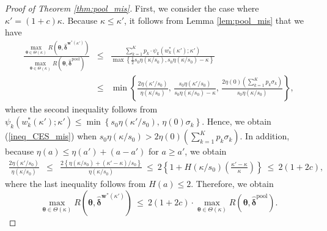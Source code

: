 \documentclass[12pt,a4paper]{article}
\begin{document}
\begin{proof}[Proof of Theorem \ref{thm:pool_mis}]
First, we consider the case where $\kappa' =(1+c)\kappa$. Because $\kappa \leq \kappa'$, it follows from Lemma \ref{lem:pool_mis} that we have
\begin{eqnarray}
\frac{\max_{\bm{\theta} \in \Theta(\kappa)} R(\bm{\theta},\hat{\bm{\delta}}^{\bm{w}^{\ast}(\kappa')})}{\max_{\bm{\theta} \in \Theta(\kappa)} R(\bm{\theta},\hat{\bm{\delta}}^{\mathrm{pool}})} & \leq & \frac{\sum_{k=1}^K p_k \cdot \psi_k\left( w_k^{\ast}(\kappa') ;\kappa' \right)}{\max \left\{ \frac{1}{2} s_0 \eta ( \kappa / s_0 ), s_0 \eta ( \kappa / s_0 ) - \kappa \right\}} \nonumber \\
& \leq & \min \left\{ \frac{2 \eta(\kappa' / s_0)}{\eta(\kappa / s_0)}, \, \frac{s_0 \eta(\kappa' / s_0)}{s_0 \eta(\kappa / s_0) - \kappa}, \, \frac{2\eta(0) \left( \sum_{k=1}^K p_k \sigma_k \right)}{s_0 \eta(\kappa / s_0)} \right\}, \nonumber
\end{eqnarray}
where the second inequality follows from $\psi_k\left( w_k^{\ast}(\kappa') ;\kappa' \right) \leq \min \left\{ s_0 \eta(\kappa' / s_0), \, \eta(0) \sigma_k \right\}$. Hence, we obtain (\ref{ineq_CES_mis}) when $s_0 \eta(\kappa / s_0) > 2\eta(0) \left( \sum_{k=1}^K p_k \sigma_k \right)$. In addition, because $\eta(a) \leq \eta(a') + (a-a')$ for $a \geq  a'$, we obtain
\begin{eqnarray*}
\frac{2 \eta(\kappa' / s_0)}{\eta(\kappa / s_0)} & \leq & \frac{2 \left\{ \eta(\kappa / s_0) + (\kappa' - \kappa)/s_0 \right\} }{\eta(\kappa / s_0)} \ \leq \ 2 \left\{ 1 + H(\kappa / s_0) \left( \frac{\kappa' - \kappa}{\kappa} \right) \right\} \ \leq \ 2(1+2c),
\end{eqnarray*}
where the last inequality follows from $H(a) \leq 2$. Therefore, we obtain
\[
\max_{\bm{\theta} \in \Theta(\kappa)} R(\bm{\theta},\hat{\bm{\delta}}^{\bm{w}^{\ast}(\kappa')}) \ \leq \ 2(1+2c) \cdot \max_{\bm{\theta} \in \Theta(\kappa)} R(\bm{\theta},\hat{\bm{\delta}}^{\mathrm{pool}}).
\]


\end{proof}
\end{document}
